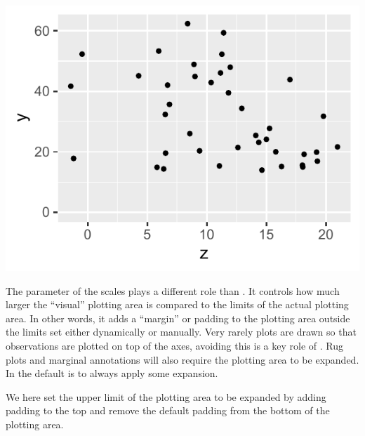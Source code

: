 \documentclass[krantz2]{krantz}\usepackage{knitr}
\begin{document}
\begin{knitrout}\footnotesize
{}\color{fgcolor}\begin{kframe}
\begin{alltt}
  \hlopt{+}
  \hlstd{()} \hlopt{+}
  \hlstd{(} \hlstd{=} \hlstd{,}  \hlstd{=} \hlstd{)}
\end{alltt}
\end{kframe}

{\centering \includegraphics[width=.54\textwidth]{figure/pos-scale-limits-04-1}

}



\end{knitrout}

The  parameter of the scales plays a different role than . It controls how much larger the ``visual'' plotting area is compared to the limits of the actual plotting area. In other words, it adds a ``margin'' or padding to the plotting area outside the limits set either dynamically or manually. Very rarely plots are drawn so that observations are plotted on top of the axes, avoiding this is a key role of . Rug plots and marginal annotations will also require the plotting area to be expanded. In \ggplot the default is to always apply some expansion.

We here set the upper limit of the plotting area to be expanded by adding padding to the top and remove the default padding from the bottom of the plotting area.

\begin{knitrout}\footnotesize
{}\color{fgcolor}\begin{kframe}
\begin{alltt}
  \hlstd{(}      \hlopt{+}
  \hlstd{(} \hlstd{=} \hlstd{)} \hlopt{+}
  \hlstd{(} \hlstd{=} \hlstd{(} \hlstd{=} \hlstd{(}\hlstd{,} \hlstd{)))}
\end{alltt}
\end{kframe}
\end{knitrout}
\end{document}
